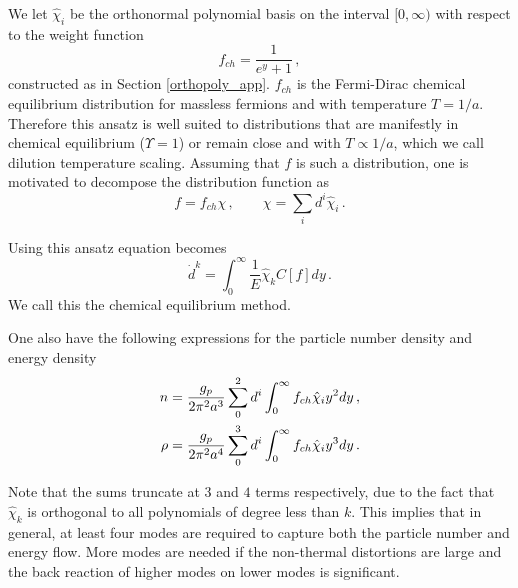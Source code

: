 We let $\hat\chi_i$ be the orthonormal polynomial basis on the interval $[0,\infty)$ with respect to the weight function
\begin{equation}\label{free_stream_weight}
f_{ch}=\frac{1}{e^y+1}\,,
\end{equation}
constructed as in Section \ref{orthopoly_app}. $f_{ch}$ is the Fermi-Dirac chemical equilibrium distribution for massless fermions and with temperature $T=1/a$.  Therefore this ansatz is well suited to distributions that are manifestly in chemical equilibrium ($\Upsilon=1$) or remain close and with $T\propto 1/a$, which we call dilution temperature scaling.  Assuming that $f$ is such a distribution, one is   motivated to decompose the distribution function as
\begin{equation}\label{free_stream_ansatz}
f=f_{ch}\chi\,,\qquad \chi=\sum_i d^i\hat\chi_i\,.
\end{equation}

Using this ansatz  equation  becomes
\begin{equation}
\dot{d}^k=\int_0^\infty\frac{1}{E}\hat{\chi}_k C[f]dy\,.
\end{equation}
We call this the chemical equilibrium method.

One also have the following expressions for the particle number density and energy density
\begin{align}\label{free_stream_moments}
n&=\frac{g_p}{2\pi^2 a^3}\sum_0^2 d^i\int_0^\infty f_{ch}\hat\chi_i y^2dy\,,\\
\rho&=\frac{g_p}{2\pi^2a^4}\sum_0^3 d^i\int_0^\infty f_{ch}\hat\chi_i y^3dy\,.\notag
\end{align}

Note that the sums truncate at $3$ and $4$ terms respectively, due to the fact that $\hat\chi_k$ is orthogonal to all polynomials of degree less than $k$. This implies that in general, at least four modes are required to capture both the particle number and energy flow. More modes are needed if the non-thermal distortions are large and the back reaction of higher modes on lower modes is significant.

